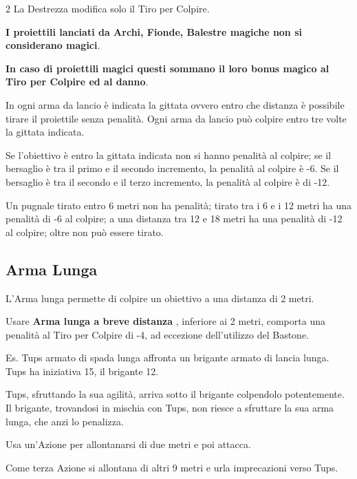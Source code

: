 \begin{multicols}{2}
La Destrezza modifica solo il Tiro per Colpire.

\textbf{I proiettili lanciati da Archi, Fionde, Balestre magiche non si considerano magici}.

\textbf{In caso di proiettili magici questi sommano il loro bonus magico al Tiro per Colpire ed al danno}.

In ogni arma da lancio è indicata la gittata ovvero entro che distanza è possibile tirare il proiettile senza penalità. Ogni arma da lancio può colpire entro tre volte la gittata indicata.

Se l'obiettivo è entro la gittata indicata non si hanno penalità al colpire; se il bersaglio è tra il primo e il secondo incremento, la penalità al colpire è -6. Se il bersaglio è tra il secondo e il terzo incremento, la penalità al colpire è di -12.

Un pugnale tirato entro 6 metri non ha penalità; tirato tra i 6 e i 12 metri ha una penalità di -6 al colpire; a una distanza tra 12 e 18 metri ha una penalità di -12 al colpire; oltre non può essere tirato.

%
\subsection{Arma Lunga} \label{armalunga}

L'Arma lunga permette di colpire un obiettivo a una distanza di 2 metri.

Usare \textbf{Arma lunga a breve distanza} \label{armalungabrevedistanza}, inferiore ai 2 metri, comporta una penalità al Tiro per Colpire di -4, ad eccezione dell'utilizzo del Bastone.

\begin{giocatore}
		Es. Tups armato di spada lunga affronta un brigante armato di lancia lunga. Tups ha iniziativa 15, il brigante 12.

		Tups, sfruttando la sua agilità, arriva sotto il brigante colpendolo potentemente. Il brigante, trovandosi in mischia con Tups, non riesce a sfruttare la sua arma lunga, che anzi lo penalizza.

		Usa un'Azione per allontanarsi di due metri e poi attacca.

		Come terza Azione si allontana di altri 9 metri e urla imprecazioni verso Tups.


\end{giocatore}
\end{multicols}
